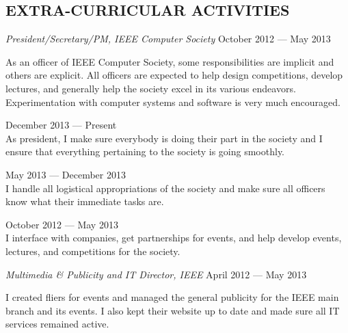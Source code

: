 \documentclass[margin]{res}
\begin{document}
\begin{resume}
  \section{EXTRA-CURRICULAR ACTIVITIES}
  {\sl President/Secretary/PM, IEEE Computer Society}
  \hfill October 2012 --- May 2013 \\
  \vspace{-1.0em}
  \begin{adjustwidth}{1.5em}{0pt}
    As an officer of IEEE Computer Society, some responsibilities are
    implicit and others are explicit. All officers are expected to
    help design competitions, develop lectures, and generally help the
    society excel in its various endeavors. Experimentation with
    computer systems and software is very much encouraged.
    \begin{description}[leftmargin=1.5em]
    \item [President] \hfill December 2013 --- Present \\
      As president, I make sure everybody is doing their part in the
      society and I ensure that everything pertaining to the society is
      going smoothly.
    \item [Secretary] \hfill May 2013 --- December 2013 \\
      I handle all logistical appropriations of the society and make
      sure all officers know what their immediate tasks are.
    \item [Project Manager] \hfill October 2012 --- May 2013 \\
      I interface with companies, get partnerships for events, and
      help develop events, lectures, and competitions for the
      society.
    \end{description}
  \end{adjustwidth}

  {\sl Multimedia \& Publicity and IT Director, IEEE}
  \hfill April 2012 --- May 2013 \\
  \vspace{-1.0em}
  \begin{adjustwidth}{1.5em}{0pt}
    I created fliers for events and managed the general publicity for
    the IEEE main branch and its events. I also kept their website up to
    date and made sure all IT services remained active.
  \end{adjustwidth}
\end{resume}
\end{document}
